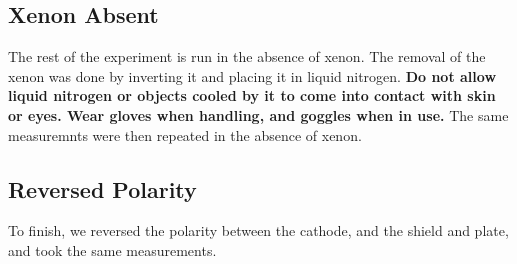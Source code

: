 \documentclass{article}
\begin{document}
\subsection{Xenon Absent}
The rest of the experiment is run in the absence of xenon. The removal of the xenon was done by inverting it and placing it in liquid nitrogen. \textbf{Do not allow liquid nitrogen or objects cooled by it to come into contact with skin or eyes. Wear gloves when handling, and goggles when in use.} The same measuremnts were then repeated in the absence of xenon.\\
\subsection{Reversed Polarity}
To finish, we reversed the polarity between the cathode, and the shield and plate, and took the same measurements.
\end{document}

